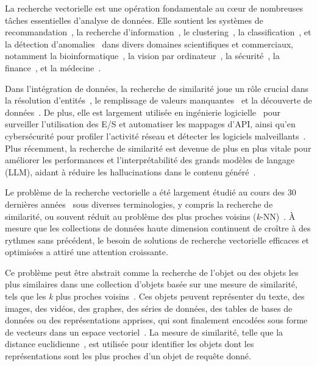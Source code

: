 La recherche vectorielle est une opération fondamentale au cœur de nombreuses tâches essentielles d'analyse de données. Elle soutient les systèmes de recommandation~\cite{conf/kdd/wang2018,amazon}, la recherche d'information~\cite{conf/williams2014}, le clustering~\cite{journal/JMLR/bubeck2009,journal/pattrecog/Warren2005}, la classification~\cite{classification,pros}, et la détection d'anomalies~\cite{discord,norma,series2graph,landmines,nba,DBLP:journals/datamine/LinardiZPK20,DBLP:journals/pvldb/BoniolPPF21,DBLP:journals/pvldb/PaparrizosKBTPF22,DBLP:journals/pvldb/PaparrizosBPTEF22} dans divers domaines scientifiques et commerciaux, notamment la bioinformatique~\cite{biof1,biof2}, la vision par ordinateur~\cite{cv1,cv2}, la sécurité~\cite{cybersecurity,cyb2}, la finance~\cite{finance1,finance2}, et la médecine~\cite{medcine1,medicin2}.

Dans l'intégration de données, la recherche de similarité joue un rôle crucial dans la résolution d'entités~\cite{journal/pvldb/ebraheem2018}, le remplissage de valeurs manquantes~\cite{retro} et la découverte de données~\cite{journal/pvldb/zhu2016}. De plus, elle est largement utilisée en ingénierie logicielle~\cite{journal/pacml/uri2019,conf/icsec/nguyen2016} pour surveiller l'utilisation des E/S et automatiser les mappages d'API, ainsi qu'en cybersécurité pour profiler l'activité réseau et détecter les logiciels malveillants~\cite{cybersecurity,cyb2}. Plus récemment, la recherche de similarité est devenue de plus en plus vitale pour améliorer les performances et l'interprétabilité des grands modèles de langage (LLM), aidant à réduire les hallucinations dans le contenu généré~\cite{retrieval-diffusion-models,dense-passage-retrieval,seq2seq,rag-nlp,rag0,rag1,rag2,rag3}.

Le problème de la recherche vectorielle a été largement étudié au cours des 30 dernières années~\cite{hnsw,hercules,rng,hydra1,hydra2} sous diverses terminologies, y compris la recherche de similarité, ou souvent réduit au problème des plus proches voisins (\textit{k}-NN)~\cite{conf/icde/echihabi2021,conf/sigmod/echihabi2020,gogolou2019progressive}. À mesure que les collections de données haute dimension continuent de croître à des rythmes sans précédent, le besoin de solutions de recherche vectorielle efficaces et optimisées a attiré une attention croissante.

Ce problème peut être abstrait comme la recherche de l'objet ou des objets les plus similaires dans une collection d'objets basée sur une mesure de similarité, tels que les \textit{k} plus proches voisins~\cite{conf/sigmod/echihabi2020, aumuller2017ann,ann-benchmark-journal}. Ces objets peuvent représenter du texte, des images, des vidéos, des graphes, des séries de données, des tables de bases de données ou des représentations apprises, qui sont finalement encodées sous forme de vecteurs dans un espace vectoriel~\cite{hydra1,hydra2,DBLP:conf/edbt/EchihabiZP21,conf/sigmod/echihabi2020}. La mesure de similarité, telle que la distance euclidienne~\cite{euclid}, est utilisée pour identifier les objets dont les représentations sont les plus proches d'un objet de requête donné.

